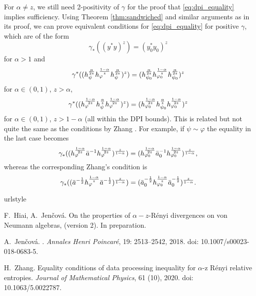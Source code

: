 \documentclass[12pt]{article}
\theoremstyle{definition}
\theoremstyle{remark}
\def\ffi{\varphi}
\begin{document}
For $\alpha\ne z$, we still need 2-positivity of $\gamma$ for the proof that
\eqref{eq:dpi_equality} implies sufficiency. Using Theorem \ref{thm:sandwiched} and
similar arguments as in its proof, we can prove equivalent conditions for
\eqref{eq:dpi_equality} for positive $\gamma$, which are  of the form 
\[
\gamma_*((y^*y)^z)=(y_0^*y_0)^z
\]
for $\alpha>1$ and
\[
\gamma^*((h_\psi^{\alpha\over 2z}h_\ffi^{1-\alpha\over z}h_\psi^{\alpha\over
2z})^z)=(h_{\psi_0}^{\alpha\over 2z}h_{\ffi_0}^{1-\alpha\over z}h_{\psi_0}^{\alpha\over 2z})^z
\]
for $\alpha\in (0,1)$, $z>\alpha$,
\[
\gamma^*((h_\ffi^{1-\alpha\over 2z}h_\psi^{\alpha\over z}h_\ffi^{1-\alpha\over
2z})^z)=(h_{\ffi_0}^{1-\alpha\over 2z}h_{\psi_0}^{\alpha\over z}h_{\ffi_0}^{1-\alpha\over 2z})^z
\]
for $\alpha\in (0,1)$, $z>1-\alpha$ (all within the DPI bounds).
This is related but not quite the same as the conditions by Zhang
\cite{zhang2020equality}. For example, if $\psi\sim\ffi$ the equality in the last case
becomes
\[
\gamma_*((h_\ffi^{1-\alpha\over2z}\bar
a^{-1}h_\ffi^{1-\alpha\over2z})^{z\over 1-\alpha})=(h_{\ffi_0}^{1-\alpha\over2z}\bar
a_0^{-1}h_{\ffi_0}^{1-\alpha\over2z})^{z\over 1-\alpha},
\]
whereas the corresponding Zhang's condition is
\[
\gamma_*((\bar a^{-\frac12}h_\ffi^{1-\alpha\over z}\bar a^{-\frac12})^{z\over 1-\alpha})=
(\bar a_0^{-\frac12}h_{\ffi_0}^{1-\alpha\over z}\bar a_0^{-\frac12})^{z\over 1-\alpha}.
\]

%
%

\begin{thebibliography}{2}
\providecommand{\natexlab}[1]{#1}
\providecommand{\url}[1]{\texttt{#1}}
\expandafter\ifx\csname urlstyle\endcsname\relax
  \providecommand{\doi}[1]{doi: #1}\else
  \providecommand{\doi}{doi: \begingroup \urlstyle{rm}\Url}\fi

F.~Hiai, A.~Jen\v cov\'a. On the properties of $\alpha-z$-R\'enyi divergences on von
Neumann algebras, (version 2). In preparation.

A.~Jen{\v c}ov{\'a}.
.
\newblock \emph{Annales Henri Poincar{\'e}}, 19: 2513--2542, 2018.
\newblock \doi{10.1007/s00023-018-0683-5}.

H.~Zhang.
\newblock Equality conditions of data processing inequality for $\alpha$-z
  R{\'e}nyi relative entropies.
\newblock \emph{Journal of Mathematical Physics}, 61 (10), 2020.
\newblock \doi{10.1063/5.0022787}.

\end{thebibliography}
\end{document}
